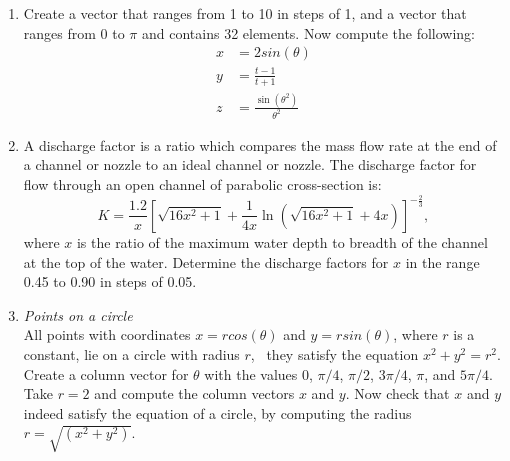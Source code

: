 {\begin{minipage}{\linewidth}
\begin{enumerate}
\item Create a vector  that ranges from 1 to 10 in steps of 1, and a vector  that ranges from 0 to $\pi$ and contains 32 elements. Now compute the following: 
\begin{align*}
x&=2sin(\theta) \\
y&=\frac{t-1}{t+1} \\
z&=\frac{\sin(\theta^2)}{\theta^2}
\end{align*}

\item A discharge factor is a ratio which compares the mass flow rate at the end of a channel or nozzle to an ideal channel or nozzle. The discharge factor for flow through an open channel of parabolic cross-section is:
\begin{equation*}
K=\frac{1.2}{x}\left[ \sqrt{16x^2+1} + \frac{1}{4x} \ln \left( \sqrt{16x^2+1} + 4x \right) \right] ^{-\frac{2}{3}},
\end{equation*}
where $x$ is the ratio of the maximum water depth to breadth of the channel at the top of the water. Determine the discharge factors for $x$ in the range 0.45 to 0.90 in steps of 0.05.

\item \textit{Points on a circle} \\
All points with coordinates $x=rcos(\theta)$ and $y=rsin(\theta)$, where $r$ is a constant, lie on a circle with radius $r$, \ie\ they satisfy the equation $x^2+y^2=r^2$. Create a column vector for $\theta$ with the values $0$, $\pi/4$, $\pi/2$, $3\pi/4$, $\pi$, and $5\pi/4$. Take $r=2$ and compute the column vectors $x$ and $y$. Now check that $x$ and $y$ indeed satisfy the equation of a circle, by computing the radius $r=\sqrt{(x^2+y^2)}$.
\end{enumerate}
\end{minipage}%
}\\
\addtolength{\parindent}{4mm}

